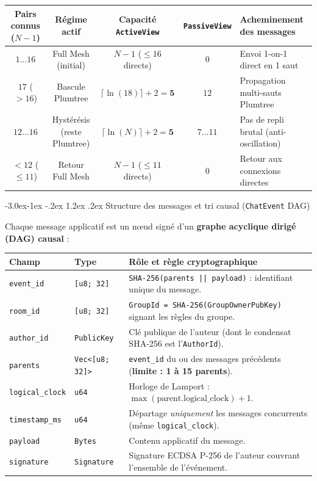 \documentclass[11pt,a4paper]{article}
\makeatletter
\renewcommand\subsection{\@startsection{subsection}{2}{\z@}%
                                     {-3.0ex\@plus -1ex \@minus -.2ex}%
                                     {1.2ex \@plus .2ex}%
                                     {\normalfont\large\bfseries\color{PrimaryBlue}}}
\makeatother
\begin{document}
\begin{center}
\footnotesize
\begin{tabular}{@{}ccccl@{}}
\toprule
\textbf{Pairs connus ($N-1$)} & \textbf{Régime actif} & \textbf{Capacité \texttt{ActiveView}} & \textbf{\texttt{PassiveView}} & \textbf{Acheminement des messages} \\
\midrule
$1 \dots 16$ & Full Mesh (initial) & $N - 1$ ($\le 16$ directs) & $0$ & Envoi 1-on-1 direct en 1 saut \\
$17$ ($>16$) & Bascule Plumtree & $\lceil \ln(18) \rceil + 2 = \mathbf{5}$ & $12$ & Propagation multi-sauts Plumtree \\
$12 \dots 16$ & Hystérésis (reste Plumtree) & $\lceil \ln(N) \rceil + 2 = \mathbf{5}$ & $7 \dots 11$ & Pas de repli brutal (anti-oscillation) \\
$< 12$ ($\le 11$) & Retour Full Mesh & $N - 1$ ($\le 11$ directs) & $0$ & Retour aux connexions directes \\
\bottomrule
\end{tabular}
\end{center}

\subsection{Structure des messages et tri causal (\texttt{ChatEvent} DAG)}

Chaque message applicatif est un nœud signé d'un \textbf{graphe acyclique dirigé (DAG) causal} :

\begin{center}
\footnotesize
\begin{tabular}{@{}llp{7.8cm}@{}}
\toprule
\textbf{Champ} & \textbf{Type} & \textbf{Rôle et règle cryptographique} \\
\midrule
\texttt{event\_id} & \texttt{[u8; 32]} & \texttt{SHA-256(parents || payload)} : identifiant unique du message. \\
\texttt{room\_id} & \texttt{[u8; 32]} & \texttt{GroupId = SHA-256(GroupOwnerPubKey)} signant les règles du groupe. \\
\texttt{author\_id} & \texttt{PublicKey} & Clé publique de l'auteur (dont le condensat SHA-256 est l'\texttt{AuthorId}). \\
\texttt{parents} & \texttt{Vec<[u8; 32]>} & \texttt{event\_id} du ou des messages précédents (\textbf{limite : 1 à 15 parents}). \\
\texttt{logical\_clock} & \texttt{u64} & Horloge de Lamport : $\max(\text{parent.logical\_clock}) + 1$. \\
\texttt{timestamp\_ms} & \texttt{u64} & Départage \emph{uniquement} les messages concurrents (même \texttt{logical\_clock}). \\
\texttt{payload} & \texttt{Bytes} & Contenu applicatif du message. \\
\texttt{signature} & \texttt{Signature} & Signature ECDSA P-256 de l'auteur couvrant l'ensemble de l'événement. \\
\bottomrule
\end{tabular}
\end{center}
\end{document}
